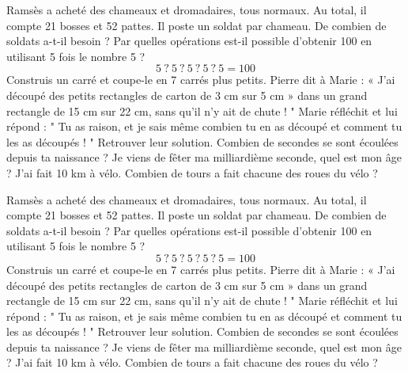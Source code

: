 \documentclass[../Cours.tex]{subfiles}
\begin{document}
\clearpage \thispagestyle{empty}
\begin{questions}
    \enigme Ramsès a acheté des chameaux et dromadaires, tous normaux. Au total, il compte 21 bosses et 52 pattes. Il poste un soldat par chameau. De combien de soldats a-t-il besoin ?
    \enigme Par quelles opérations est-il possible d’obtenir 100 en utilisant 5 fois le nombre 5 ? 
\[ 5 ~?~ 5 ~?~ 5 ~?~ 5 ~?~ 5 = 100 \]
    \enigme Construis un carré et coupe-le en 7 carrés plus petits.
    \enigme Pierre dit à Marie : « J’ai découpé des petits rectangles de carton de 3 cm sur 5 cm » dans un grand rectangle de 15 cm sur 22 cm, sans qu’il n’y ait de chute ! " Marie réfléchit et lui répond : " Tu as raison, et je sais même combien tu en as découpé et comment tu les as découpés ! " Retrouver leur solution.
    \enigme Combien de secondes se sont écoulées depuis ta naissance ?
    \enigme Je viens de fêter ma milliardième seconde, quel est mon âge ?
    \enigme J’ai fait 10 km à vélo. Combien de tours a fait chacune des roues du vélo ?
\end{questions}

\clearpage \thispagestyle{empty}
\begin{questions}
    \enigme Ramsès a acheté des chameaux et dromadaires, tous normaux. Au total, il compte 21 bosses et 52 pattes. Il poste un soldat par chameau. De combien de soldats a-t-il besoin ?
    \enigme Par quelles opérations est-il possible d’obtenir 100 en utilisant 5 fois le nombre 5 ? 
\[ 5 ~?~ 5 ~?~ 5 ~?~ 5 ~?~ 5 = 100 \]
    \enigme Construis un carré et coupe-le en 7 carrés plus petits.
    \enigme Pierre dit à Marie : « J’ai découpé des petits rectangles de carton de 3 cm sur 5 cm » dans un grand rectangle de 15 cm sur 22 cm, sans qu’il n’y ait de chute ! " Marie réfléchit et lui répond : " Tu as raison, et je sais même combien tu en as découpé et comment tu les as découpés ! " Retrouver leur solution.
    \enigme Combien de secondes se sont écoulées depuis ta naissance ?
    \enigme Je viens de fêter ma milliardième seconde, quel est mon âge ?
    \enigme J’ai fait 10 km à vélo. Combien de tours a fait chacune des roues du vélo ?
\end{questions}

\clearpage
\begin{center}
\end{center}    
\end{document}
